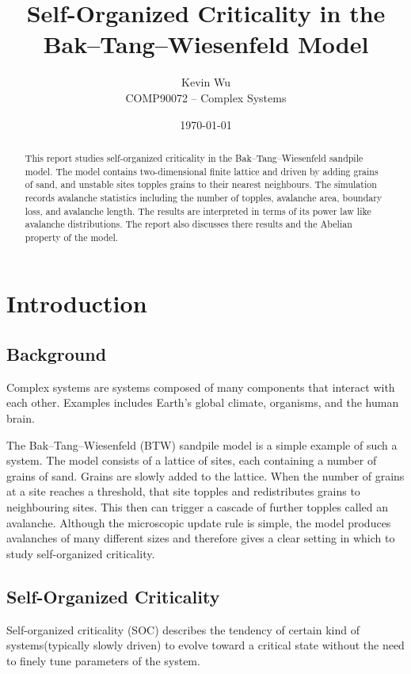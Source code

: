 \documentclass[11pt]{article}
\title{Self-Organized Criticality in the Bak--Tang--Wiesenfeld Model}
\author{Kevin Wu \\ COMP90072 -- Complex Systems}
\date{\today}
\begin{document}
\maketitle

\begin{abstract}
This report studies self-organized criticality in the Bak--Tang--Wiesenfeld sandpile model. 
The model contains two-dimensional finite lattice and driven by adding grains of sand, and unstable sites topples grains to their nearest neighbours. 
The simulation records avalanche statistics including the number of topples, avalanche area, boundary loss, and avalanche length. 
The results are interpreted in terms of its power law like avalanche distributions. 
The report also discusses there results and the Abelian property of the model.
\end{abstract}

\tableofcontents
\newpage

\section{Introduction}

\subsection{Background}

Complex systems are systems composed of many components that interact with each other. 
Examples includes Earth's global climate, organisms, and the human brain.

The Bak–Tang–Wiesenfeld (BTW) sandpile model is a simple example of such a system. 
The model consists of a lattice of sites, each containing a number of grains of sand. 
Grains are slowly added to the lattice. 
When the number of grains at a site reaches a threshold, that site topples and redistributes grains to neighbouring sites. 
This then can trigger a cascade of further topples called an avalanche. 
Although the microscopic update rule is simple, the model produces avalanches of many different sizes and therefore gives a clear setting in which to study self-organized criticality.

\subsection{Self-Organized Criticality}

Self-organized criticality (SOC) describes the tendency of certain kind of systems(typically slowly driven) to evolve toward a critical state without the need to finely tune parameters of the system. 
\end{document}
